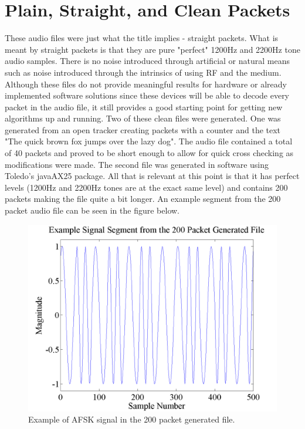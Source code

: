 \section{Plain, Straight, and Clean Packets}
These audio files were just what the title implies - straight packets. What is meant by straight packets is that they are pure "perfect" 1200Hz and 2200Hz tone audio samples. There is no noise introduced through artificial or natural means such as noise introduced through the intrinsics of using RF and the medium. Although these files do not provide meaningful results for hardware or already implemented software solutions since these devices will be able to decode every packet in the audio file, it still provides a good starting point for getting new algorithms up and running. Two of these clean files were generated. One was generated from an open tracker creating packets with a counter and the text "The quick brown fox jumps over the lazy dog". The audio file contained a total of 40 packets and proved to be short enough to allow for quick cross checking as modifications were made. The second file was generated in software using Toledo's javaAX25 package. All that is relevant at this point is that it has perfect levels (1200Hz and 2200Hz tones are at the exact same level) and contains 200 packets making the file quite a bit longer. An example segment from the 200 packet audio file can be seen in the figure below.
\begin{figure}
  \centering
	\includegraphics[width=0.75\linewidth]{images/Examplesignalsegmentfromthe200packetgeneratedfile.png} 
	\caption{Example of AFSK signal in the 200 packet generated file.}
\end{figure}

